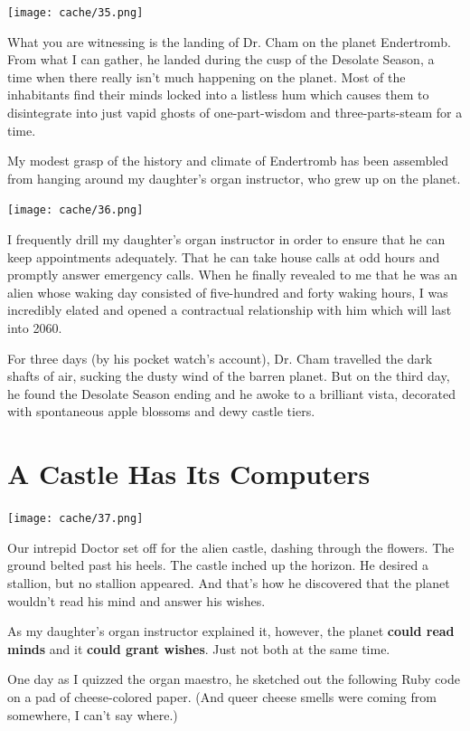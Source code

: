 \documentclass[12pt,twoside]{report}
\begin{document}
\begin{center}
	\texttt{[image: cache/35.png]}
\end{center}

What you are witnessing is the landing of Dr. Cham on the planet
Endertromb.  From what I can gather, he landed during the cusp of the
Desolate Season, a time when there really isn't much happening on the
planet.  Most of the inhabitants find their minds locked into a
listless hum which causes them to disintegrate into just vapid ghosts
of one-part-wisdom and three-parts-steam for a time.

My modest grasp of the history and climate of Endertromb has been
assembled from hanging around my daughter's organ instructor, who grew
up on the planet.

	\texttt{[image: cache/36.png]}

I frequently drill my daughter's organ instructor in order to ensure
that he can keep appointments adequately.  That he can take house
calls at odd hours and promptly answer emergency calls. When he
finally revealed to me that he was an alien whose waking day consisted
of five-hundred and forty waking hours, I was incredibly elated and
opened a contractual relationship with him which will last into 2060.

For three days (by his pocket watch's account), Dr. Cham travelled the
dark shafts of air, sucking the dusty wind of the barren planet. But
on the third day, he found the Desolate Season ending and he awoke to
a brilliant vista, decorated with spontaneous apple blossoms and dewy
castle tiers.


\section{A Castle Has Its Computers}


	\texttt{[image: cache/37.png]}

Our intrepid Doctor set off for the alien castle, dashing through the
flowers.  The ground belted past his heels.  The castle inched up the
horizon.  He desired a stallion, but no stallion appeared.  And that's
how he discovered that the planet wouldn't read his mind and answer
his wishes.

As my daughter's organ instructor explained it, however, the planet
{\bf could read minds} and it {\bf could grant wishes}.  Just not both
at the same time.

One day as I quizzed the organ maestro, he sketched out the following
Ruby code on a pad of cheese-colored paper.  (And queer cheese smells
were coming from somewhere, I can't say where.)
\end{document}
